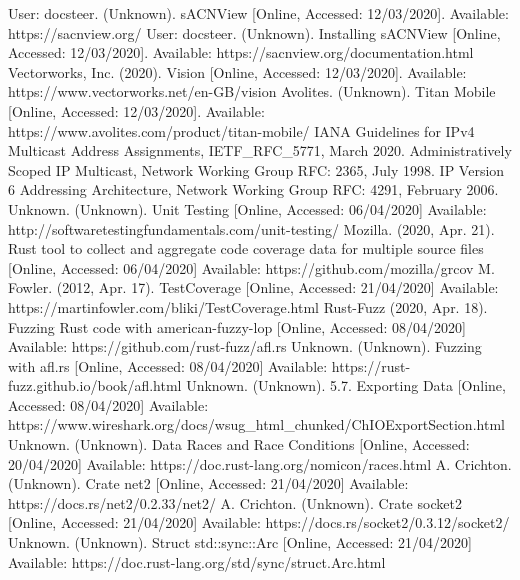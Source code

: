 \documentclass[11pt,a4paper]{article}
\begin{document}
\begin{thebibliography}{20}
	User: docsteer. (Unknown). sACNView [Online, Accessed: 12/03/2020]. Available: https://sacnview.org/
	User: docsteer. (Unknown). Installing sACNView [Online, Accessed: 12/03/2020]. Available: https://sacnview.org/documentation.html
	Vectorworks, Inc. (2020). Vision [Online, Accessed: 12/03/2020]. Available:
	https://www.vectorworks.net/en-GB/vision
	Avolites. (Unknown). Titan Mobile [Online, Accessed: 12/03/2020]. Available: https://www.avolites.com/product/titan-mobile/
	IANA Guidelines for IPv4 Multicast Address Assignments, IETF\_RFC\_5771, March 2020.
	Administratively Scoped IP Multicast, Network Working Group RFC: 2365, July 1998.
	IP Version 6 Addressing Architecture, Network Working Group RFC: 4291, February 2006.
	Unknown. (Unknown). Unit Testing [Online, Accessed: 06/04/2020] Available: http://softwaretestingfundamentals.com/unit-testing/
	Mozilla. (2020, Apr. 21). Rust tool to collect and aggregate code coverage data for multiple source files [Online, Accessed: 06/04/2020] Available: https://github.com/mozilla/grcov
	M. Fowler. (2012, Apr. 17). TestCoverage [Online, Accessed: 21/04/2020] Available: https://martinfowler.com/bliki/TestCoverage.html
	Rust-Fuzz (2020, Apr. 18). Fuzzing Rust code with american-fuzzy-lop [Online, Accessed: 08/04/2020] Available: https://github.com/rust-fuzz/afl.rs
	Unknown. (Unknown). Fuzzing with afl.rs [Online, Accessed: 08/04/2020] Available: https://rust-fuzz.github.io/book/afl.html
	Unknown. (Unknown). 5.7. Exporting Data [Online, Accessed: 08/04/2020] Available: 
	https://www.wireshark.org/docs/wsug\_html\_chunked/ChIOExportSection.html
	Unknown. (Unknown). Data Races and Race Conditions [Online, Accessed: 20/04/2020] Available: https://doc.rust-lang.org/nomicon/races.html
	A. Crichton. (Unknown). Crate net2 [Online, Accessed: 21/04/2020] Available: https://docs.rs/net2/0.2.33/net2/
	A. Crichton. (Unknown). Crate socket2 [Online, Accessed: 21/04/2020] Available:
	https://docs.rs/socket2/0.3.12/socket2/
	Unknown. (Unknown). Struct std::sync::Arc [Online, Accessed: 21/04/2020] Available: https://doc.rust-lang.org/std/sync/struct.Arc.html
\end{thebibliography}







\end{document}
